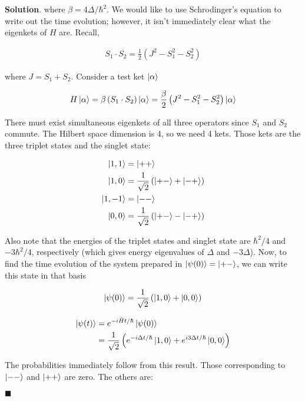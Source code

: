 \documentclass[12pt]{article}
\theoremstyle{definition}
\newenvironment{s}{%
        \begin{trivlist} \item \textbf{Solution}. }{%
            \hspace*{\fill} $\blacksquare$\end{trivlist}}%
\begin{document}
{\begin{s}
where $\beta = 4\Delta/\hbar^{2}$. We would like to use Schrodinger's equation to write out the time evolution; however, it isn't immediately clear what the eigenkets of $H$ are. Recall,

\begin{align*}
S_{1}\cdot S_{2} = \frac{1}{2}\left(J^{2} - S_{1}^{2} - S_{2}^{2}\right)
\end{align*}

where $J = S_{1} + S_{2}$. Consider a test ket $\ket{\alpha}$

\begin{align*}
H\ket{\alpha} = \beta\left(S_{1}\cdot S_{2}\right)\ket{\alpha} = \frac{\beta}{2}\left(J^{2} - S_{1}^{2} - S_{2}^{2}\right)\ket{\alpha}
\end{align*}

There must exist simultaneous eigenkets of all three operators since $S_{1}$ and $S_{2}$ commute. The Hilbert space dimension is 4, so we need 4 kets. Those kets are the three triplet states and the singlet state:

\begin{align*}
\ket{1,1} &= \ket{++}\\ 
\ket{1,0} &= \frac{1}{\sqrt{2}}\left(\ket{+-} + \ket{-+}\right)\\
\ket{1,-1} &= \ket{--}\\
\ket{0,0} &= \frac{1}{\sqrt{2}}\left(\ket{+-} - \ket{-+}\right)\\ 
\end{align*}

Also note that the energies of the triplet states and singlet state are $\hbar^{2}/4$ and $-3\hbar^{2}/4$, respectively (which gives energy eigenvalues of $\Delta$ and $-3\Delta$). Now, to find the time evolution of the system prepared in $\ket{\psi(0)} = \ket{+-}$, we can write this state in that basis

\begin{align*}
\ket{\psi(0)} = \frac{1}{\sqrt{2}}\left(\ket{1,0} + \ket{0,0}\right)
\end{align*}

\begin{align*}
\ket{\psi(t)} &= e^{-i\hat{H}t/\hbar}\ket{\psi(0)}\\
&= \frac{1}{\sqrt{2}}\left(e^{-i\Delta t/\hbar}\ket{1,0} + e^{i3\Delta t/\hbar}\ket{0,0}\right)
\end{align*}

The probabilities immediately follow from this result. Those corresponding to $\ket{--}$ and $\ket{++}$ are zero. The others are:


\end{s}}
\end{document}
